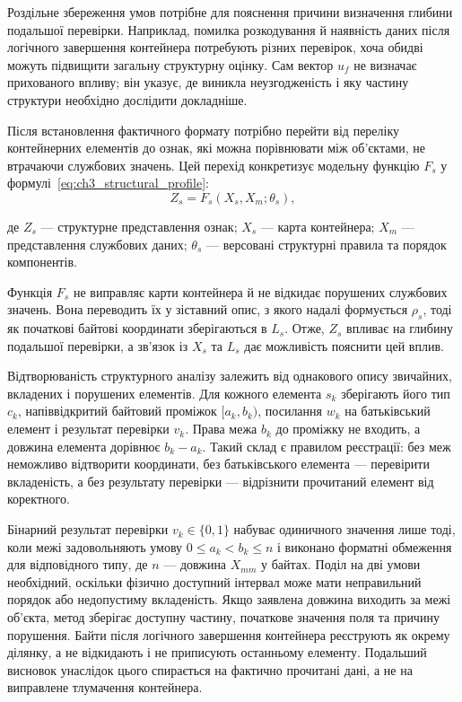 Роздільне збереження умов потрібне для пояснення причини визначення глибини подальшої перевірки. Наприклад, помилка розкодування й наявність даних після логічного завершення контейнера потребують різних перевірок, хоча обидві можуть підвищити загальну структурну оцінку. Сам вектор $u_f$ не визначає прихованого впливу; він указує, де виникла неузгодженість і яку частину структури необхідно дослідити докладніше.

Після встановлення фактичного формату потрібно перейти від переліку контейнерних елементів до ознак, які можна порівнювати між об’єктами, не втрачаючи службових значень. Цей перехід конкретизує модельну функцію $F_s$ у формулі~\eqref{eq:ch3_structural_profile}:
\begin{equation}
Z_s=F_s(X_s,X_m;\theta_s),
\label{eq:ch3_structural_profile}
\end{equation}

де $Z_s$ --- структурне представлення ознак; $X_s$ --- карта контейнера; $X_m$ --- представлення службових даних; $\theta_s$ --- версовані структурні правила та порядок компонентів.

Функція $F_s$ не виправляє карти контейнера й не відкидає порушених службових значень. Вона переводить їх у зіставний опис, з якого надалі формується $\rho_s$, тоді як початкові байтові координати зберігаються в $L_s$. Отже, $Z_s$ впливає на глибину подальшої перевірки, а зв’язок із $X_s$ та $L_s$ дає можливість пояснити цей вплив.

Відтворюваність структурного аналізу залежить від однакового опису звичайних, вкладених і порушених елементів. Для кожного елемента $s_k$ зберігають його тип $c_k$, напіввідкритий байтовий проміжок $[a_k,b_k)$, посилання $w_k$ на батьківський елемент і результат перевірки $v_k$. Права межа $b_k$ до проміжку не входить, а довжина елемента дорівнює $b_k-a_k$. Такий склад є правилом реєстрації: без меж неможливо відтворити координати, без батьківського елемента --- перевірити вкладеність, а без результату перевірки --- відрізнити прочитаний елемент від коректного.

Бінарний результат перевірки $v_k\in\{0,1\}$ набуває одиничного значення лише тоді, коли межі задовольняють умову $0\leq a_k<b_k\leq n$ і виконано форматні обмеження для відповідного типу, де $n$ --- довжина $X_{mm}$ у байтах. Поділ на дві умови необхідний, оскільки фізично доступний інтервал може мати неправильний порядок або недопустиму вкладеність. Якщо заявлена довжина виходить за межі об’єкта, метод зберігає доступну частину, початкове значення поля та причину порушення. Байти після логічного завершення контейнера реєструють як окрему ділянку, а не відкидають і не приписують останньому елементу. Подальший висновок унаслідок цього спирається на фактично прочитані дані, а не на виправлене тлумачення контейнера.

